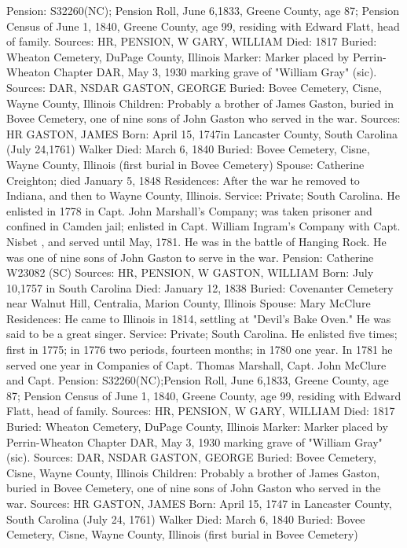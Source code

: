 Pension: S32260(NC); Pension Roll, June 6,1833, Greene County, age 87; Pension Census of June 1, 1840, Greene County, age 99, residing with Edward Flatt, head of family. 
Sources: HR, PENSION, W 
GARY, WILLIAM 
Died: 1817 
Buried: Wheaton Cemetery, DuPage County, Illinois 
Marker: Marker placed by Perrin-Wheaton Chapter DAR, May 3, 1930 marking grave of  "William Gray" (sic). 
Sources: DAR, NSDAR 
GASTON, GEORGE 
Buried: Bovee Cemetery, Cisne, Wayne County, Illinois 
Children: Probably a brother of James Gaston, buried in Bovee Cemetery, one of nine sons of John Gaston who served in the war. 
Sources: HR 
GASTON, JAMES 
Born: April 15, 1747in Lancaster County, South Carolina (July 24,1761) Walker 
Died: March 6, 1840 
Buried: Bovee Cemetery, Cisne, Wayne County, Illinois (first burial in Bovee Cemetery) 
Spouse: Catherine Creighton; died January 5, 1848 
Residences: After the war he removed to Indiana, and then to Wayne County, Illinois. 
Service: Private; South Carolina. He enlisted in 1778 in Capt. John Marshall's Company; was taken prisoner and confined in Camden jail; enlisted in Capt. William Ingram's Company with Capt. Nisbet , and served until May, 1781. He was in the battle of Hanging Rock. He was one of nine sons of John Gaston to serve in the war. 
Pension: Catherine W23082 (SC) 
Sources: HR, PENSION, W 
GASTON, WILLIAM 
Born: July 10,1757 in South Carolina 
Died: January 12, 1838 
Buried: Covenanter Cemetery near Walnut Hill, Centralia, Marion County, Illinois 
Spouse: Mary McClure Residences: He came to Illinois in 1814, settling at "Devil's Bake Oven." He was said to be a great singer. 
Service: Private; South Carolina. He enlisted five times; first in 1775; in 1776 two periods, fourteen months; in 1780 one year. In 1781 he served one year in Companies of Capt. Thomas Marshall, Capt. John McClure and Capt.  
Pension: S32260(NC);Pension Roll, June 6,1833, Greene County, age 87; Pension Census of June 1, 1840, Greene County, age 99, residing with Edward Flatt, head of family. 
Sources: HR, PENSION, W 
GARY, WILLIAM 
Died: 1817 
Buried: Wheaton Cemetery, DuPage County, Illinois 
Marker: Marker placed by Perrin-Wheaton Chapter DAR, May 3, 1930 marking grave of "William Gray" (sic). 
Sources:  DAR, NSDAR 
GASTON, GEORGE 
Buried: Bovee Cemetery, Cisne, Wayne County, Illinois 
Children: Probably a brother of James Gaston, buried in Bovee Cemetery, one of nine sons of John Gaston who served in the war. 
Sources: HR 
GASTON, JAMES 
Born: April 15, 1747 in Lancaster County, South Carolina (July 24, 1761) Walker 
Died: March 6, 1840 
Buried: Bovee Cemetery, Cisne, Wayne County, Illinois (first burial in Bovee Cemetery) 

